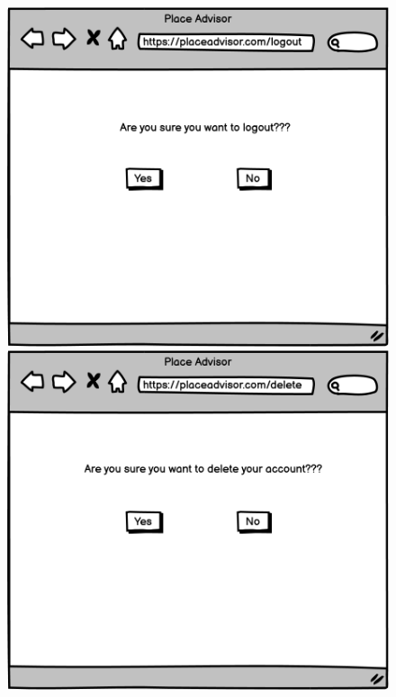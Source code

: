 \documentclass[../main.tex]{subfiles}
\begin{document}
\begin{figure}[h!]
  \begin{multicols}{2}
    \includegraphics[width=\linewidth]{../figures/mockup/New Wireframe 1.png}\par 
    \includegraphics[width=\linewidth]{../figures/mockup/New Wireframe 1 copy.png}\par 
  \end{multicols}
\end{figure}
\end{document}
